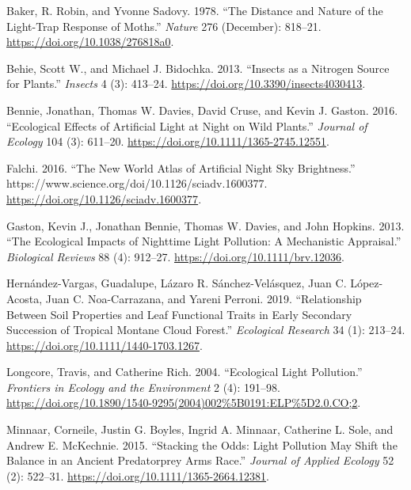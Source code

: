 \documentclass[
]{article}
\newlength{\cslhangindent}
\newlength{\cslentryspacingunit} %
\newenvironment{CSLReferences}[2] %
 {%
  \setlength{\parindent}{0pt}
  \ifodd #1
  \let\oldpar\par
  \def\par{\hangindent=\cslhangindent\oldpar}
  \fi
  \setlength{\parskip}{#2\cslentryspacingunit}
 }%
 {}
\begin{document}
\hypertarget{refs}{}
\begin{CSLReferences}{1}{0}
\leavevmode{}%
Baker, R. Robin, and Yvonne Sadovy. 1978. {``The Distance and Nature of
the Light-Trap Response of Moths.''} \emph{Nature} 276 (December):
818--21. \url{https://doi.org/10.1038/276818a0}.

\leavevmode{}%
Behie, Scott W., and Michael J. Bidochka. 2013. {``Insects as a
{Nitrogen Source} for {Plants}.''} \emph{Insects} 4 (3): 413--24.
\url{https://doi.org/10.3390/insects4030413}.

\leavevmode{}%
Bennie, Jonathan, Thomas W. Davies, David Cruse, and Kevin J. Gaston.
2016. {``Ecological Effects of Artificial Light at Night on Wild
Plants.''} \emph{Journal of Ecology} 104 (3): 611--20.
\url{https://doi.org/10.1111/1365-2745.12551}.

\leavevmode{}%
Falchi. 2016. {``The New World Atlas of Artificial Night Sky
Brightness.''} https://www.science.org/doi/10.1126/sciadv.1600377.
\url{https://doi.org/10.1126/sciadv.1600377}.

\leavevmode{}%
Gaston, Kevin J., Jonathan Bennie, Thomas W. Davies, and John Hopkins.
2013. {``The Ecological Impacts of Nighttime Light Pollution: A
Mechanistic Appraisal.''} \emph{Biological Reviews} 88 (4): 912--27.
\url{https://doi.org/10.1111/brv.12036}.

\leavevmode{}%
Hernández-Vargas, Guadalupe, Lázaro R. Sánchez-Velásquez, Juan C.
López-Acosta, Juan C. Noa-Carrazana, and Yareni Perroni. 2019.
{``Relationship Between Soil Properties and Leaf Functional Traits in
Early Secondary Succession of Tropical Montane Cloud Forest.''}
\emph{Ecological Research} 34 (1): 213--24.
\url{https://doi.org/10.1111/1440-1703.1267}.

\leavevmode{}%
Longcore, Travis, and Catherine Rich. 2004. {``Ecological Light
Pollution.''} \emph{Frontiers in Ecology and the Environment} 2 (4):
191--98.
\url{https://doi.org/10.1890/1540-9295(2004)002\%5B0191:ELP\%5D2.0.CO;2}.

\leavevmode{}%
Minnaar, Corneile, Justin G. Boyles, Ingrid A. Minnaar, Catherine L.
Sole, and Andrew E. McKechnie. 2015. {``Stacking the Odds: Light
Pollution May Shift the Balance in an Ancient Predator\textendash prey
Arms Race.''} \emph{Journal of Applied Ecology} 52 (2): 522--31.
\url{https://doi.org/10.1111/1365-2664.12381}.


\end{CSLReferences}
\end{document}
